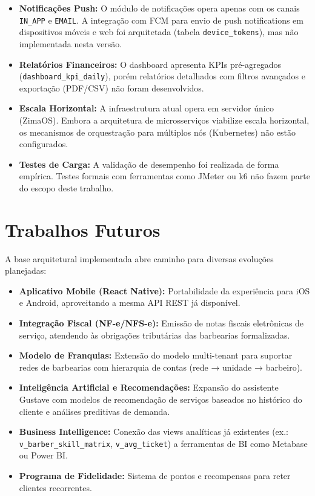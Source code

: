 \documentclass[
    12pt, 
    a4paper, 
    oneside, 
    chapter=TITLE, 
    section=TITLE
]{abntex2}
\begin{document}
\begin{itemize}
    \item \textbf{Notificações Push:} O módulo de notificações opera apenas com os canais \texttt{IN\_APP} e \texttt{EMAIL}. A integração com FCM para envio de push notifications em dispositivos móveis e web foi arquitetada (tabela \texttt{device\_tokens}), mas não implementada nesta versão.
    \item \textbf{Relatórios Financeiros:} O dashboard apresenta KPIs pré-agregados (\texttt{dashboard\_kpi\_daily}), porém relatórios detalhados com filtros avançados e exportação (PDF/CSV) não foram desenvolvidos.
    \item \textbf{Escala Horizontal:} A infraestrutura atual opera em servidor único (ZimaOS). Embora a arquitetura de microsserviços viabilize escala horizontal, os mecanismos de orquestração para múltiplos nós (Kubernetes) não estão configurados.
    \item \textbf{Testes de Carga:} A validação de desempenho foi realizada de forma empírica. Testes formais com ferramentas como JMeter ou k6 não fazem parte do escopo deste trabalho.
\end{itemize}

\section{Trabalhos Futuros}
A base arquitetural implementada abre caminho para diversas evoluções planejadas:

\begin{itemize}
    \item \textbf{Aplicativo Mobile (React Native):} Portabilidade da experiência para iOS e Android, aproveitando a mesma API REST já disponível.
    \item \textbf{Integração Fiscal (NF-e/NFS-e):} Emissão de notas fiscais eletrônicas de serviço, atendendo às obrigações tributárias das barbearias formalizadas.
    \item \textbf{Modelo de Franquias:} Extensão do modelo multi-tenant para suportar redes de barbearias com hierarquia de contas (rede → unidade → barbeiro).
    \item \textbf{Inteligência Artificial e Recomendações:} Expansão do assistente Gustave com modelos de recomendação de serviços baseados no histórico do cliente e análises preditivas de demanda.
    \item \textbf{Business Intelligence:} Conexão das views analíticas já existentes (ex.: \texttt{v\_barber\_skill\_matrix}, \texttt{v\_avg\_ticket}) a ferramentas de BI como Metabase ou Power BI.
    \item \textbf{Programa de Fidelidade:} Sistema de pontos e recompensas para reter clientes recorrentes.
\end{itemize}
\end{document}

